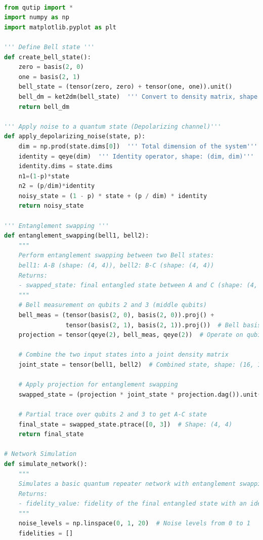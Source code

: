 \documentclass[12pt]{ieeetj}
\begin{document}
\begin{lstlisting}[language=Python, caption=Entanglement swapping(fidelity vs polarizing noise), label=code:entanglement-swap]

from qutip import *
import numpy as np
import matplotlib.pyplot as plt

''' Define Bell state '''
def create_bell_state():
    zero = basis(2, 0)  
    one = basis(2, 1)   
    bell_state = (tensor(zero, zero) + tensor(one, one)).unit()  
    bell_dm = ket2dm(bell_state)  ''' Convert to density matrix, shape: (4, 4)'''
    return bell_dm

''' Apply noise to a quantum state (Depolarizing channel)'''
def apply_depolarizing_noise(state, p):
    dim = np.prod(state.dims[0])  ''' Total dimension of the system'''
    identity = qeye(dim)  ''' Identity operator, shape: (dim, dim)'''
    identity.dims = state.dims
    n1=(1-p)*state
    n2 = (p/dim)*identity
    noisy_state = (1 - p) * state + (p / dim) * identity
    return noisy_state

''' Entanglement swapping '''
def entanglement_swapping(bell1, bell2):
    """
    Perform entanglement swapping between two Bell states:
    bell1: A-B (shape: (4, 4)), bell2: B-C (shape: (4, 4))
    Returns:
    - swapped_state: final entangled state between A and C (shape: (4, 4))
    """
    # Bell measurement on qubits 2 and 3 (middle qubits)
    bell_meas = (tensor(basis(2, 0), basis(2, 0)).proj() + 
                 tensor(basis(2, 1), basis(2, 1)).proj())  # Bell basis, shape: (4, 4)
    projection = tensor(qeye(2), bell_meas, qeye(2))  # Operate on qubits 2 and 3, shape: (16, 16)
    
    # Combine the two input states into a joint density matrix
    joint_state = tensor(bell1, bell2)  # Combined state, shape: (16, 16)
    
    # Apply projection for entanglement swapping
    swapped_state = (projection * joint_state * projection.dag()).unit()  # Shape: (16, 16)
    
    # Partial trace over qubits 2 and 3 to get A-C state
    final_state = swapped_state.ptrace([0, 3])  # Shape: (4, 4)
    return final_state

# Network Simulation
def simulate_network():
    """
    Simulates a basic quantum repeater network with entanglement swapping.
    Returns:
    - fidelity_value: fidelity of the final entangled state with an ideal Bell state
    """
    noise_levels = np.linspace(0, 1, 20)  # Noise levels from 0 to 1
    fidelities = []



\end{lstlisting}
\end{document}

